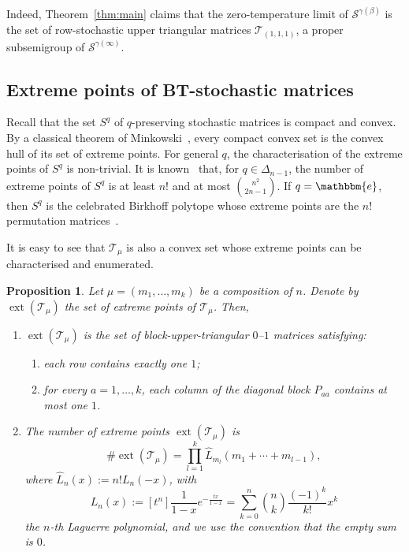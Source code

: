 \documentclass[11pt,a4paper,longbibliography]{amsart}
\numberwithin{equation}{section}
\def\e{\mathbbm{e}}
\theoremstyle{plain}
\newtheorem{prop}[thm]{Proposition}
\theoremstyle{definition}
\theoremstyle{remark}
\begin{document}
	Indeed, Theorem~\ref{thm:main} claims that the zero-temperature limit of $\mathcal{S}^{\gamma(\beta)}$ is the set of row-stochastic upper triangular matrices $\mathcal{T}_{(1,1,1)}$, a proper subsemigroup of $ \mathcal{S}^{\gamma(\infty)}$.
	
	\subsection{Extreme points of BT-stochastic matrices}
	
	Recall that the set $S^q$ of $q$-preserving stochastic matrices is compact and convex. By a classical theorem of Minkowski~\cite{brondsted2012introduction}, every compact convex set is the convex hull of its set of extreme points. For general $q$, the characterisation of the extreme points of $S^q$ is non-trivial. It is known~\cite[Remark 4.5]{joe1990majorization} that, for $q\in\Delta_{n-1}$,
	the number of extreme points of $S^q$ is at least $n!$ and at most $\binom{n^2}{2n-1}$. 
	If $q=\e$, then  $S^q$ is the celebrated Birkhoff polytope whose extreme points are the $n!$ permutation matrices~\cite{birkhoff1946tres}. 
	
	
	
	It is easy to see that $\mathcal{T}_{\mu}$ is also a convex set whose extreme points can be characterised and enumerated. 
	
	\begin{prop}
		\label{prop:extreme_pts}
		Let $\mu=(m_1,\ldots, m_k)$ be a composition of $n$.  Denote by $\operatorname{ext}(\mathcal{T}_{\mu})$ the set of extreme points of $\mathcal{T}_{\mu}$. Then, 
		\begin{enumerate}
			\item $\operatorname{ext}(\mathcal{T}_{\mu})$ is the set of  block-upper-triangular $0$--$1$ matrices satisfying:
			\begin{enumerate}
				\item each row contains exactly one $1$;
				\item for every $a=1,\ldots,k$, each column of the diagonal block $P_{aa}$ contains at most one $1$.
			\end{enumerate}
			\item The number of extreme points $\operatorname{ext}(\mathcal{T}_{\mu})$ is
			\begin{equation}
				\label{eq:Laguerre_repr}
				\#\operatorname{ext}(\mathcal{T}_{\mu})=\prod_{l=1}^k\widehat{L}_{m_l}\left(m_1+\cdots+m_{l-1}\right),
			\end{equation}
			where $\widehat{L}_n(x):=n!L_n(-x)$, with
			\begin{equation}
				L_n(x):=[t^n]\frac{1}{1-x}e^{-\frac{tx}{1-x}}=\sum_{k=0}^{n}\binom{n}{k}\frac{(-1)^k}{k!}x^k
			\end{equation} 
			the $n$-th Laguerre polynomial, 
			and we use the convention that the empty sum is $0$.
		\end{enumerate} 
		
	\end{prop}
	
\end{document}
